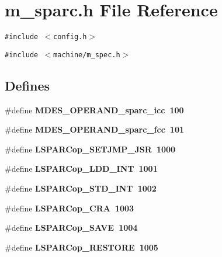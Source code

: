 \section{m\_\-sparc.h File Reference}
\label{m__sparc_8h}
{\tt \#include $<$config.h$>$}\par
{\tt \#include $<$machine/m\_\-spec.h$>$}\par
\subsection*{Defines}
\begin{CompactItemize}
\item 
\#define \bf{MDES\_\-OPERAND\_\-sparc\_\-icc}~100
\item 
\#define \bf{MDES\_\-OPERAND\_\-sparc\_\-fcc}~101
\item 
\#define \bf{LSPARCop\_\-SETJMP\_\-JSR}~1000
\item 
\#define \bf{LSPARCop\_\-LDD\_\-INT}~1001
\item 
\#define \bf{LSPARCop\_\-STD\_\-INT}~1002
\item 
\#define \bf{LSPARCop\_\-CRA}~1003
\item 
\#define \bf{LSPARCop\_\-SAVE}~1004
\item 
\#define \bf{LSPARCop\_\-RESTORE}~1005
\end{CompactItemize}
